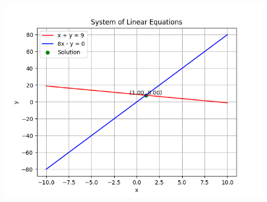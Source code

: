 \documentclass[journal]{IEEEtran}
\numberwithin{equation}{enumi}
\numberwithin{figure}{enumi}
\begin{document}
\begin{figure}[H]
    \centering
    \includegraphics[width=\textwidth]{figs/fig.png}
\end{figure}
\end{document}
